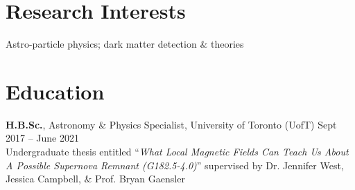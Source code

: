\documentclass[10pt]{res} %
\begin{document}
\begin{resume}


\section{\Large Research Interests}
\vspace{-5pt} %
\noindent\makebox[\linewidth]{\rule{\textwidth}{0.4pt}}
\vspace{-20pt} %

Astro-particle physics; dark matter detection $\&$ theories


\section{\Large Education}
\vspace{-5pt} %
\noindent\makebox[\linewidth]{\rule{\textwidth}{0.4pt}}
\vspace{-20pt} %

{\bf H.B.Sc.}, Astronomy \& Physics Specialist, University of Toronto (UofT) \hfill Sept 2017 -- June 2021 \\ 
Undergraduate thesis entitled ``\textit{What Local Magnetic Fields Can Teach Us About A Possible Supernova Remnant (G182.5-4.0)}'' supervised by Dr. Jennifer West, Jessica Campbell, $\&$ Prof. Bryan Gaensler
 




\end{resume}
\end{document}
